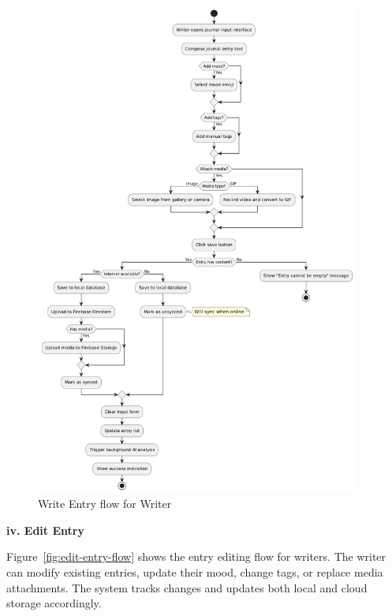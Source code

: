 \begin{figure}[H]
\centering
\includegraphics[width=0.95\textwidth,height=0.7\textheight,keepaspectratio]{files/imgs/write_entry_flow.png}
\caption{Write Entry flow for Writer}
\label{fig:write-entry-flow}
\end{figure}
\clearpage

\textbf{iv. Edit Entry}

Figure~\ref{fig:edit-entry-flow} shows the entry editing flow for writers. The writer can modify existing entries, update their mood, change tags, or replace media attachments. The system tracks changes and updates both local and cloud storage accordingly.

